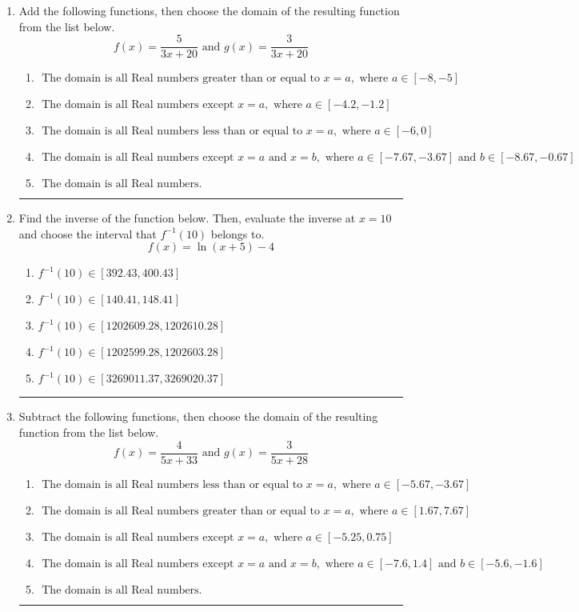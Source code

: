 \documentclass[14pt]{extbook}
\newcommand{\litem}[1]{\item#1\hspace*{-1cm}\rule{\textwidth}{0.4pt}}
\begin{document}
\begin{enumerate}
{\begin{enumerate}[label=\Alph*.]
\end{enumerate} }
\litem{
Add the following functions, then choose the domain of the resulting function from the list below.\[ f(x) = \frac{5}{3x+20} \text{ and } g(x) = \frac{3}{3x+20} \]\begin{enumerate}[label=\Alph*.]
\item \( \text{ The domain is all Real numbers greater than or equal to } x = a, \text{ where } a \in [-8, -5] \)
\item \( \text{ The domain is all Real numbers except } x = a, \text{ where } a \in [-4.2, -1.2] \)
\item \( \text{ The domain is all Real numbers less than or equal to } x = a, \text{ where } a \in [-6, 0] \)
\item \( \text{ The domain is all Real numbers except } x = a \text{ and } x = b, \text{ where } a \in [-7.67, -3.67] \text{ and } b \in [-8.67, -0.67] \)
\item \( \text{ The domain is all Real numbers. } \)

\end{enumerate} }
\litem{
Find the inverse of the function below. Then, evaluate the inverse at $x = 10$ and choose the interval that $f^{-1}(10)$ belongs to.\[ f(x) = \ln{(x+5)}-4 \]\begin{enumerate}[label=\Alph*.]
\item \( f^{-1}(10) \in [392.43, 400.43] \)
\item \( f^{-1}(10) \in [140.41, 148.41] \)
\item \( f^{-1}(10) \in [1202609.28, 1202610.28] \)
\item \( f^{-1}(10) \in [1202599.28, 1202603.28] \)
\item \( f^{-1}(10) \in [3269011.37, 3269020.37] \)

\end{enumerate} }
\litem{
Subtract the following functions, then choose the domain of the resulting function from the list below.\[ f(x) = \frac{4}{5x+33} \text{ and } g(x) = \frac{3}{5x+28} \]\begin{enumerate}[label=\Alph*.]
\item \( \text{ The domain is all Real numbers less than or equal to } x = a, \text{ where } a \in [-5.67, -3.67] \)
\item \( \text{ The domain is all Real numbers greater than or equal to } x = a, \text{ where } a \in [1.67, 7.67] \)
\item \( \text{ The domain is all Real numbers except } x = a, \text{ where } a \in [-5.25, 0.75] \)
\item \( \text{ The domain is all Real numbers except } x = a \text{ and } x = b, \text{ where } a \in [-7.6, 1.4] \text{ and } b \in [-5.6, -1.6] \)
\item \( \text{ The domain is all Real numbers. } \)


\end{enumerate}}
\end{enumerate}
\end{document}
